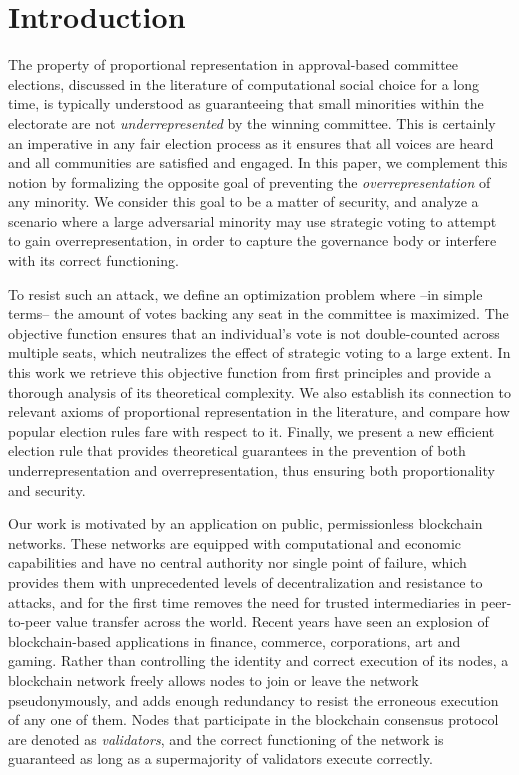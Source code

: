 \section{Introduction}

The property of proportional representation in approval-based committee elections, discussed in the literature of computational social choice for a long time, is typically understood as guaranteeing that small minorities within the electorate are not \emph{underrepresented} by the winning committee. This is certainly an imperative in any fair election process as it ensures that all voices are heard and all communities are satisfied and engaged. 
In this paper, we complement this notion by formalizing the opposite goal of preventing the \emph{overrepresentation} of any minority. We consider this goal to be a matter of security, and analyze a scenario where a large adversarial minority may use strategic voting to attempt to gain overrepresentation, in order to capture the governance body or interfere with its correct functioning. 

To resist such an attack, we define an optimization problem where --in simple terms-- the amount of votes backing any seat in the committee is maximized. The objective function ensures that an individual's vote is not double-counted across multiple seats, which neutralizes the effect of strategic voting to a large extent. In this work we retrieve this objective function from first principles and provide a thorough analysis of its theoretical complexity. We also establish its connection to relevant axioms of proportional representation in the literature, and compare how popular election rules fare with respect to it. Finally, we present a new efficient election rule that provides theoretical guarantees in the prevention of both underrepresentation and overrepresentation, thus ensuring both proportionality and security.

Our work is motivated by an application on public, permissionless blockchain networks. These networks are equipped with computational and economic capabilities and have no central authority nor single point of failure, which provides them with unprecedented levels of decentralization and resistance to attacks, and for the first time removes the need for trusted intermediaries in peer-to-peer value transfer across the world. Recent years have seen an explosion of blockchain-based applications in finance, commerce, corporations, art and gaming. Rather than controlling the identity and correct execution of its nodes, a blockchain network freely allows nodes to join or leave the network pseudonymously, and adds enough redundancy to resist the erroneous execution of any one of them. Nodes that participate in the blockchain consensus protocol are denoted as \emph{validators}, and the correct functioning of the network is guaranteed as long as a supermajority of validators execute correctly.

